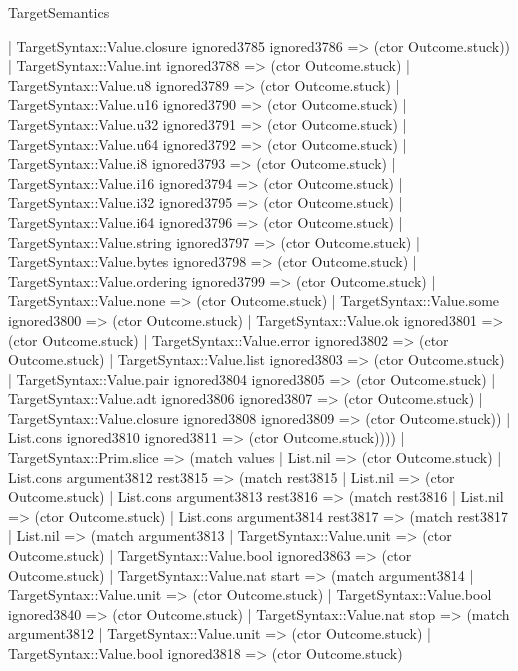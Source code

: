 \begin{lexlean}{TargetSemantics}
\begin{semanticmodule}
{              | TargetSyntax::Value.closure ignored3785 ignored3786 => (ctor Outcome.stuck))
            | TargetSyntax::Value.int ignored3788 => (ctor Outcome.stuck)
            | TargetSyntax::Value.u8 ignored3789 => (ctor Outcome.stuck)
            | TargetSyntax::Value.u16 ignored3790 => (ctor Outcome.stuck)
            | TargetSyntax::Value.u32 ignored3791 => (ctor Outcome.stuck)
            | TargetSyntax::Value.u64 ignored3792 => (ctor Outcome.stuck)
            | TargetSyntax::Value.i8 ignored3793 => (ctor Outcome.stuck)
            | TargetSyntax::Value.i16 ignored3794 => (ctor Outcome.stuck)
            | TargetSyntax::Value.i32 ignored3795 => (ctor Outcome.stuck)
            | TargetSyntax::Value.i64 ignored3796 => (ctor Outcome.stuck)
            | TargetSyntax::Value.string ignored3797 => (ctor Outcome.stuck)
            | TargetSyntax::Value.bytes ignored3798 => (ctor Outcome.stuck)
            | TargetSyntax::Value.ordering ignored3799 => (ctor Outcome.stuck)
            | TargetSyntax::Value.none => (ctor Outcome.stuck)
            | TargetSyntax::Value.some ignored3800 => (ctor Outcome.stuck)
            | TargetSyntax::Value.ok ignored3801 => (ctor Outcome.stuck)
            | TargetSyntax::Value.error ignored3802 => (ctor Outcome.stuck)
            | TargetSyntax::Value.list ignored3803 => (ctor Outcome.stuck)
            | TargetSyntax::Value.pair ignored3804 ignored3805 => (ctor Outcome.stuck)
            | TargetSyntax::Value.adt ignored3806 ignored3807 => (ctor Outcome.stuck)
            | TargetSyntax::Value.closure ignored3808 ignored3809 => (ctor Outcome.stuck))
          | List.cons ignored3810 ignored3811 => (ctor Outcome.stuck))))
    | TargetSyntax::Prim.slice => (match values
      | List.nil => (ctor Outcome.stuck)
      | List.cons argument3812 rest3815 => (match rest3815
        | List.nil => (ctor Outcome.stuck)
        | List.cons argument3813 rest3816 => (match rest3816
          | List.nil => (ctor Outcome.stuck)
          | List.cons argument3814 rest3817 => (match rest3817
            | List.nil => (match argument3813
              | TargetSyntax::Value.unit => (ctor Outcome.stuck)
              | TargetSyntax::Value.bool ignored3863 => (ctor Outcome.stuck)
              | TargetSyntax::Value.nat start => (match argument3814
                | TargetSyntax::Value.unit => (ctor Outcome.stuck)
                | TargetSyntax::Value.bool ignored3840 => (ctor Outcome.stuck)
                | TargetSyntax::Value.nat stop => (match argument3812
                  | TargetSyntax::Value.unit => (ctor Outcome.stuck)
                  | TargetSyntax::Value.bool ignored3818 => (ctor Outcome.stuck)
}
\end{semanticmodule}
\end{lexlean}
